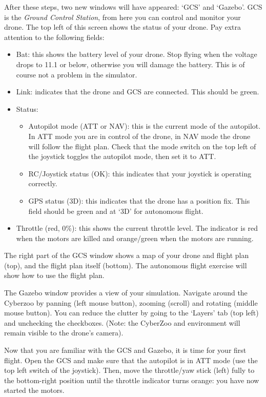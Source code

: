 \documentclass{article}
\begin{document}
After these steps, two new windows will have appeared: `GCS' and `Gazebo'.
GCS is the \emph{Ground Control Station}, from here you can control and monitor your drone.
The top left of this screen shows the status of your drone. Pay extra attention to the following fields:
\begin{itemize}
\item Bat: this shows the battery level of your drone. Stop flying when the voltage drops to 11.1 or below, otherwise you will damage the battery. This is of course not a problem in the simulator.
\item Link: indicates that the drone and GCS are connected. This should be green.
\item Status:
\begin{itemize}
\item Autopilot mode (ATT or NAV): this is the current mode of the autopilot. In ATT mode you are in control of the drone, in NAV mode the drone will follow the flight plan. Check that the mode switch on the top left of the joystick toggles the autopilot mode, then set it to ATT.
\item RC/Joystick status (OK): this indicates that your joystick is operating correctly.
\item GPS status (3D): this indicates that the drone has a position fix. This field should be green and at `3D' for autonomous flight.
\end{itemize}
\item Throttle (red, 0\%): this shows the current throttle level. The indicator is red when the motors are killed and orange/green when the motors are running.
\end{itemize}
The right part of the GCS window shows a map of your drone and flight plan (top), and the flight plan itself (bottom). The autonomous flight exercise will show how to use the flight plan.

\medskip
The Gazebo window provides a view of your simulation. Navigate around the Cyberzoo by panning (left mouse button), zooming (scroll) and rotating (middle mouse button).
You can reduce the clutter by going to the `Layers' tab (top left) and unchecking the checkboxes. (Note: the CyberZoo and environment will remain visible to the drone's camera).

\medskip
Now that you are familiar with the GCS and Gazebo, it is time for your first flight.
Open the GCS and make sure that the autopilot is in ATT mode (use the top left switch of the joystick). Then, move the throttle/yaw stick (left) fully to the bottom-right position until the throttle indicator turns orange: you have now started the motors.
\end{document}
